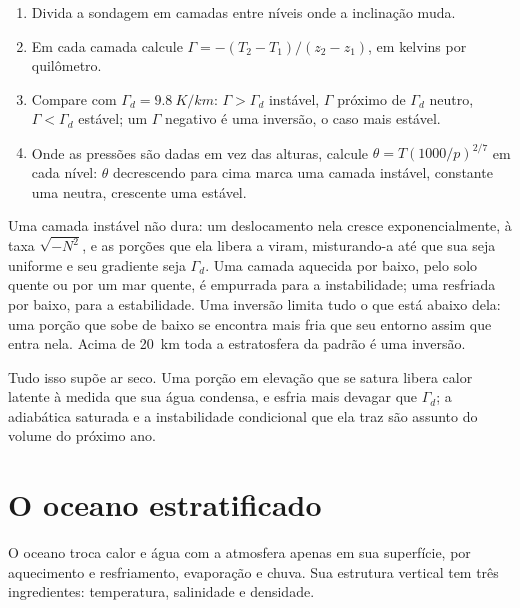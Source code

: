 \begin{method}\label{met:b1:fluid-envelopes-structure:sounding}
\begin{enumerate}
  \item Divida a sondagem em camadas entre níveis onde a inclinação muda.
  \item Em cada camada calcule $\Gamma = -(T_2 - T_1)/(z_2 - z_1)$, em kelvins por quilômetro.
  \item Compare com $\Gamma_d = \qty{9.8}{K/km}$: $\Gamma > \Gamma_d$ instável, $\Gamma$ próximo
        de $\Gamma_d$ neutro, $\Gamma < \Gamma_d$ estável; um $\Gamma$ negativo é uma inversão, o
        caso mais estável.
  \item Onde as pressões são dadas em vez das alturas, calcule $\theta =
        T(1000/p)^{2/7}$ em cada nível: $\theta$ decrescendo para cima marca uma camada instável,
        constante uma neutra, crescente uma estável.
\end{enumerate}
\end{method}

Uma camada instável não dura: um deslocamento nela cresce exponencialmente, à taxa
$\sqrt{-N^2}$, e as porções que ela libera a viram, misturando-a até que sua  seja uniforme e seu gradiente seja $\Gamma_d$. Uma camada aquecida por baixo, pelo solo
quente ou por um mar quente, é empurrada para a instabilidade; uma resfriada por baixo, para a
estabilidade. Uma inversão limita tudo o que está abaixo dela: uma porção que sobe de baixo se
encontra mais fria que seu entorno assim que entra nela. Acima de \qty{20}{km} toda a
estratosfera da padrão é uma inversão.

Tudo isso supõe ar seco. Uma porção em elevação que se satura libera calor latente à medida que
sua água condensa, e esfria mais devagar que $\Gamma_d$; a adiabática saturada e a instabilidade
condicional que ela traz são assunto do volume do próximo ano.

\section{O oceano estratificado}\label{sec:b1:fluid-envelopes-structure:ocean}

O oceano troca calor e água com a atmosfera apenas em sua superfície, por aquecimento e
resfriamento, evaporação e chuva. Sua estrutura vertical tem três ingredientes: temperatura,
salinidade e densidade.

